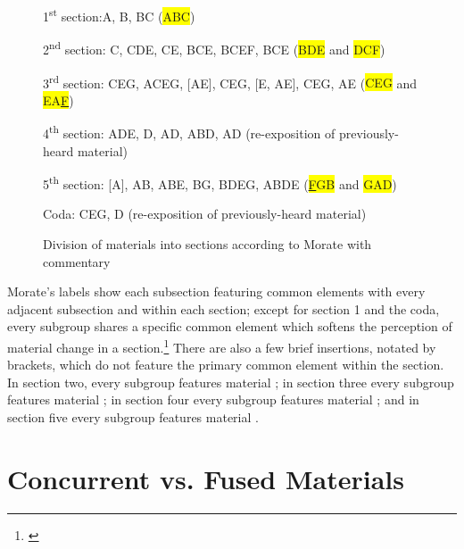 \begin{figure}[H]
\small
1\textsuperscript{st} section:A, B, BC (\colorbox{yellow}{ABC})

2\textsuperscript{nd} section: \textcolor{printBlue}{C}, \textcolor{printBlue}{C}DE, \textcolor{printBlue}{C}E, B\textcolor{printBlue}{C}E, B\textcolor{printBlue}{C}EF, B\textcolor{printBlue}{C}E (\colorbox{yellow}{BDE} and \colorbox{yellow}{DCF})

3\textsuperscript{rd} section: CE\textcolor{printBlue}{G}, ACE\textcolor{printBlue}{G}, [AE], CE\textcolor{printBlue}{G}, [E, AE], CE\textcolor{printBlue}{G}, AE (\colorbox{yellow}{CEG} and \colorbox{yellow}{EA\underline{F}})

4\textsuperscript{th} section: A\textcolor{printBlue}{D}E, \textcolor{printBlue}{D}, A\textcolor{printBlue}{D}, AB\textcolor{printBlue}{D}, A\textcolor{printBlue}{D} (re-exposition of previously-heard material)

5\textsuperscript{th} section: [A], A\textcolor{printBlue}{B}, A\textcolor{printBlue}{B}E, \textcolor{printBlue}{B}G, \textcolor{printBlue}{B}DEG, A\textcolor{printBlue}{B}DE (\colorbox{yellow}{\underline{F}GB} and \colorbox{yellow}{GAD})

Coda: CEG, D (re-exposition of previously-heard material)
\normalsize
    \caption{Division of materials into sections according to Morate with commentary}
    \label{fig:rhea-form}
\end{figure}

Morate's labels show each subsection featuring common elements with every adjacent subsection and within each section; except for section 1 and the coda, every subgroup shares a specific common element which softens the perception of material change in a section.\footnote{\citet[285-286]{guerreropaper}} There are also a few brief insertions, notated by brackets, which do not feature the primary common element within the section. In section two, every subgroup features material ; in section three every subgroup features material ; in section four every subgroup features material ; and in section five every subgroup features material .

\section{Concurrent vs. Fused Materials}

